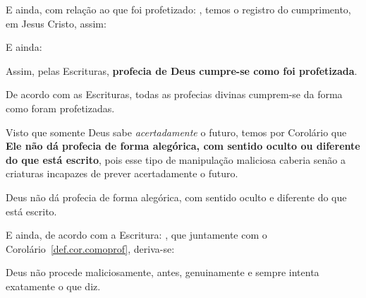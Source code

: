    E ainda, com relação ao que foi profetizado: ,  temos  o  registro  do
    cumprimento, em Jesus Cristo, assim:


    E ainda:


    Assim, pelas Escrituras, \textbf{profecia de Deus cumpre-se como foi profetizada}.

    \begin{DEF}
        \label{def.pri.comoprof}
        De acordo com as Escrituras, todas as profecias divinas cumprem-se da forma como foram profetizadas.
    \end{DEF}

    Visto que somente Deus sabe \emph{acertadamente} o futuro, temos por Corolário que \textbf{Ele  não  dá  profecia  de  forma
    alegórica, com sentido oculto ou diferente do que está escrito}, pois esse tipo de manipulação  maliciosa  caberia  senão  a
    criaturas incapazes de prever acertadamente o futuro.

    \begin{COR}
        \label{def.cor.comoprof}
        Deus não dá profecia de forma alegórica, com sentido oculto e diferente do que está escrito.
    \end{COR}

    E ainda, de acordo com a Escritura: , que
    juntamente com o Corolário~\ref{def.cor.comoprof}, deriva-se:

    \begin{COR}
        \label{def.cor.genu}
        Deus não procede maliciosamente, antes, genuinamente e sempre intenta exatamente o que diz.
    \end{COR}


